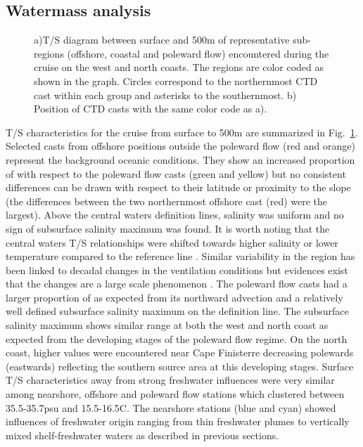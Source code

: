 \subsection{Watermass analysis}
\begin{figure}[t]
\arribacap \centering %
%
\quad%
\caption{a)T/S diagram between surface and 500m of representative
sub-regions (offshore, coastal and poleward flow) encountered
during the cruise on the west and north coasts. The regions are
color coded as shown in the graph. Circles correspond to the
northernmost CTD cast within each group and asterisks to the
southernmost. b) Position of CTD casts with the same color code as
a).} \label{fig:thal_TS}
\end{figure}

T/S characteristics for the cruise from surface to 500m are
summarized in Fig.~\ref{fig:thal_TS}. Selected casts from offshore
positions outside the poleward flow (red and orange) represent the
background oceanic conditions. They show an increased proportion
of \enawp with respect to the poleward flow casts (green and
yellow) but no consistent differences can be drawn with respect to
their latitude or proximity to the slope (the differences between
the two northernmost offshore cast (red) were the largest). Above
the central waters definition lines, salinity was uniform and no
sign of subsurface salinity maximum was found. It is worth noting
that the central waters T/S relationships were shifted towards
higher salinity or lower temperature compared to the \enaw
reference line \citep{Rios92}. Similar variability in the region
has been linked to decadal changes in the \enawp ventilation
conditions \citep{Perez95,Pollard96} but evidences exist that the
changes are a large scale phenomenon \citep{Huthnance02}. The
poleward flow casts had a larger proportion of \enawt as expected
from its northward advection and a relatively well defined
subsurface salinity maximum on the \enawt definition line. The
subsurface salinity maximum shows similar range at both the west
and north coast as expected from the developing stages of the
poleward flow regime. On the north coast, higher values were
encountered near Cape Finisterre decreasing polewards (eastwards)
reflecting the southern source area at this developing stages.
Surface T/S characteristics away from strong freshwater influences
were very similar among nearshore, offshore and poleward flow
stations which clustered between 35.5-35.7psu and 15.5-16.5\deg C.
The nearshore stations (blue and cyan) showed influences of
freshwater origin ranging from thin freshwater plumes to
vertically mixed shelf-freshwater waters as described in previous
sections. \FloatBarrier
